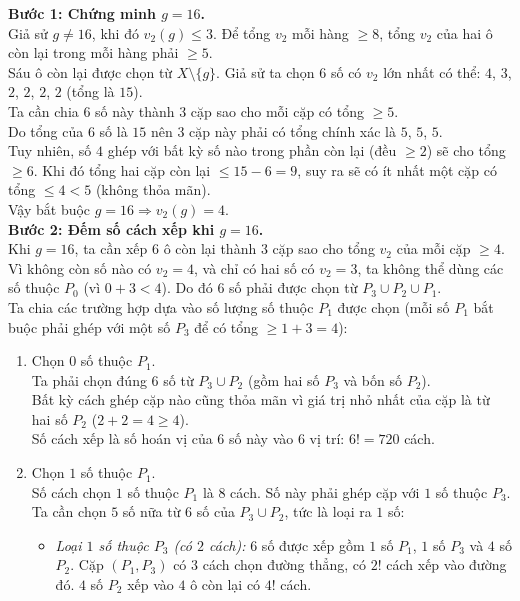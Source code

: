 \begin{ex}
{		\textbf{Bước 1: Chứng minh $g = 16$.}\\
		Giả sử $g \ne 16$, khi đó $v_2(g) \le 3$. Để tổng $v_2$ mỗi hàng $\ge 8$, tổng $v_2$ của hai ô còn lại trong mỗi hàng phải $\ge 5$.\\
		Sáu ô còn lại được chọn từ $X \setminus \{g\}$. Giả sử ta chọn $6$ số có $v_2$ lớn nhất có thể: $4$, $3$, $2$, $2$, $2$, $2$ (tổng là $15$).\\
		Ta cần chia $6$ số này thành $3$ cặp sao cho mỗi cặp có tổng $\ge 5$.\\
		Do tổng của $6$ số là $15$ nên $3$ cặp này phải có tổng chính xác là $5$, $5$, $5$.\\
		Tuy nhiên, số $4$ ghép với bất kỳ số nào trong phần còn lại (đều $\ge 2$) sẽ cho tổng $\ge 6$. Khi đó tổng hai cặp còn lại $\le 15 - 6 = 9$, suy ra sẽ có ít nhất một cặp có tổng $\le 4 < 5$ (không thỏa mãn).\\
		Vậy bắt buộc $g = 16 \Rightarrow v_2(g) = 4$.\\
		\textbf{Bước 2: Đếm số cách xếp khi $g=16$.}\\
		Khi $g=16$, ta cần xếp $6$ ô còn lại thành $3$ cặp sao cho tổng $v_2$ của mỗi cặp $\ge 4$.\\
		Vì không còn số nào có $v_2=4$, và chỉ có hai số có $v_2=3$, ta không thể dùng các số thuộc $P_0$ (vì $0+3 < 4$). Do đó $6$ số phải được chọn từ $P_3 \cup P_2 \cup P_1$.\\
		Ta chia các trường hợp dựa vào số lượng số thuộc $P_1$ được chọn (mỗi số $P_1$ bắt buộc phải ghép với một số $P_3$ để có tổng $\ge 1+3=4$):
		\begin{enumerate}[\it TH 1:]
			\item Chọn $0$ số thuộc $P_1$.\\
			Ta phải chọn đúng $6$ số từ $P_3 \cup P_2$ (gồm hai số $P_3$ và bốn số $P_2$).\\
			Bất kỳ cách ghép cặp nào cũng thỏa mãn vì giá trị nhỏ nhất của cặp là từ hai số $P_2$ ($2+2=4 \ge 4$).\\
			Số cách xếp là số hoán vị của $6$ số này vào $6$ vị trí: $6! = 720$ cách.
			\item Chọn $1$ số thuộc $P_1$.\\
			Số cách chọn $1$ số thuộc $P_1$ là $8$ cách. Số này phải ghép cặp với $1$ số thuộc $P_3$.\\
			Ta cần chọn $5$ số nữa từ $6$ số của $P_3 \cup P_2$, tức là loại ra $1$ số:
			\begin{itemize}
				\item \textit{Loại $1$ số thuộc $P_3$ (có $2$ cách):} $6$ số được xếp gồm $1$ số $P_1$, $1$ số $P_3$ và $4$ số $P_2$. Cặp $(P_1, P_3)$ có $3$ cách chọn đường thẳng, có $2!$ cách xếp vào đường đó. $4$ số $P_2$ xếp vào $4$ ô còn lại có $4!$ cách.\\

\end{itemize}
\end{enumerate}}
\end{ex}
